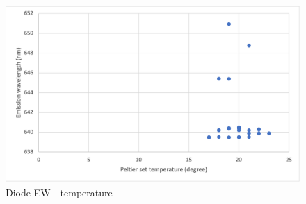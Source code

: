 \documentclass[12pt]{report}
\begin{document}
\begin{figure}[H]
    \centering
    \includegraphics{diodeLaserEW.png}
    \caption{Diode EW - temperature}
    \label{fig:diodeLaserEW}
\end{figure}
\end{document}
